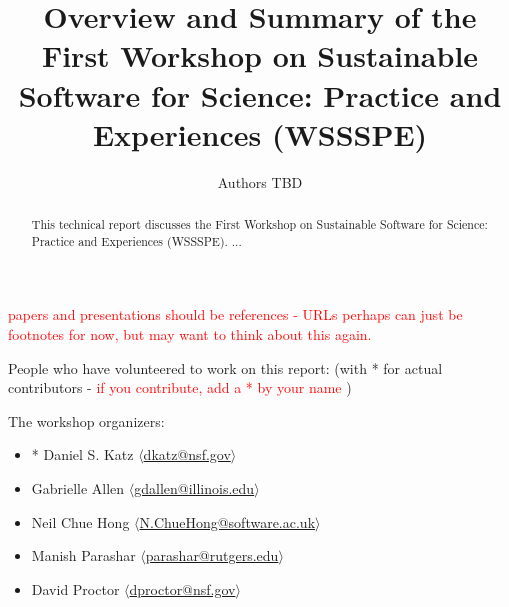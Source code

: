 \documentclass[11pt, oneside]{amsart}
\newcommand{\note}[1]{ {\textcolor{red}    { #1 }}}
\begin{document}
\title[]{Overview and Summary of the First Workshop on Sustainable Software for Science: Practice and Experiences (WSSSPE)}

\author{Authors TBD}

%
%
%
%
%  

    
\begin{abstract}
This technical report discusses the First Workshop on Sustainable Software for Science: Practice and Experiences (WSSSPE). ...
\end{abstract}


\maketitle

\note{papers and presentations should be references - URLs perhaps can just be footnotes for now, but may want to think about this again.}

People who have volunteered to work on this report: (with * for actual contributors - \note{if you contribute, add a * by your name})

The workshop organizers:
\begin{itemize}
\item * Daniel S. Katz $\langle$\url{dkatz@nsf.gov}$\rangle$
\item Gabrielle Allen $\langle$\url{gdallen@illinois.edu}$\rangle$
\item Neil Chue Hong $\langle$\url{N.ChueHong@software.ac.uk}$\rangle$
\item Manish Parashar $\langle$\url{parashar@rutgers.edu}$\rangle$
\item David Proctor $\langle$\url{dproctor@nsf.gov}$\rangle$
\end{itemize}
\end{document}
